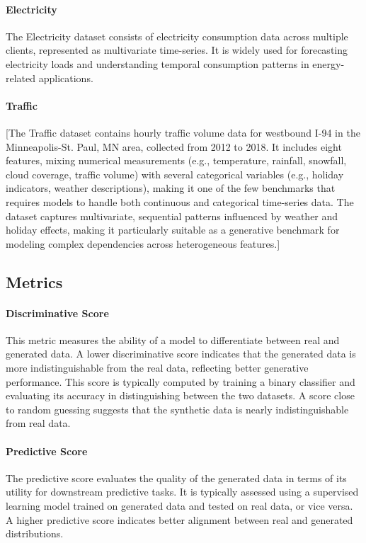 \documentclass{article}
\theoremstyle{plain}
\theoremstyle{definition}
\theoremstyle{remark}
\newcommand {\idan}[1]{{\color{red}[#1]}}
\begin{document}
{\paragraph{Electricity} 
The Electricity dataset consists of electricity consumption data across multiple clients, represented as multivariate time-series. It is widely used for forecasting electricity loads and understanding temporal consumption patterns in energy-related applications.

\paragraph{Traffic} 
\idan{The Traffic dataset \cite{metro_interstate_traffic_volume_492} contains hourly traffic volume data for westbound I-94 in the Minneapolis-St. Paul, MN area, collected from 2012 to 2018. It includes eight features, mixing numerical measurements (e.g., temperature, rainfall, snowfall, cloud coverage, traffic volume) with several categorical variables (e.g., holiday indicators, weather descriptions), making it one of the few benchmarks that requires models to handle both continuous and categorical time-series data. The dataset captures multivariate, sequential patterns influenced by weather and holiday effects, making it particularly suitable as a generative benchmark for modeling complex dependencies across heterogeneous features.}


\subsection{Metrics}
\label{app:metrics}

\paragraph{Discriminative Score} 
This metric measures the ability of a model to differentiate between real and generated data. A lower discriminative score indicates that the generated data is more indistinguishable from the real data, reflecting better generative performance. 
This score is typically computed by training a binary classifier and evaluating its accuracy in distinguishing between the two datasets. A score close to random guessing suggests that the synthetic data is nearly indistinguishable from real data.

\paragraph{Predictive Score} 
The predictive score evaluates the quality of the generated data in terms of its utility for downstream predictive tasks. It is typically assessed using a supervised learning model trained on generated data and tested on real data, or vice versa. A higher predictive score indicates better alignment between real and generated distributions.

}
\end{document}
